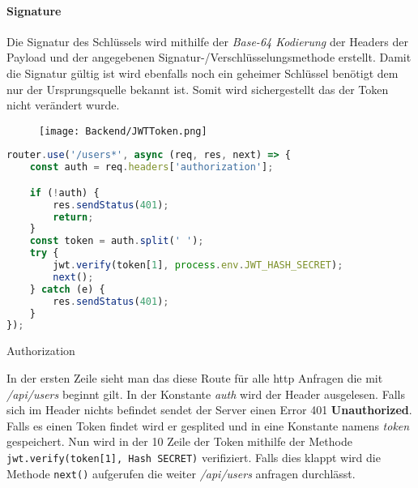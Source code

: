 \paragraph{Signature}
Die Signatur des Schlüssels wird mithilfe der \textit{Base-64 Kodierung} der Headers
der Payload und der angegebenen Signatur-/Verschlüsselungsmethode erstellt. Damit die Signatur
gültig ist wird ebenfalls noch ein geheimer Schlüssel benötigt dem nur der Ursprungsquelle bekannt
ist. Somit wird sichergestellt das der Token nicht verändert wurde.

\begin{figure}[H]
    \begin{center}
        \texttt{[image: Backend/JWTToken.png]}
    \end{center}
    \cite{PictureJWT}
\end{figure}

\pagebreak


\begin{code}[htp]
    \begin{lstlisting}[firstnumber=1,language=JavaScript, style=CMD]
    router.use('/users*', async (req, res, next) => {
    const auth = req.headers['authorization'];

    if (!auth) {
        res.sendStatus(401);
        return;
    }
    const token = auth.split(' ');
    try {
        jwt.verify(token[1], process.env.JWT_HASH_SECRET);
        next();
    } catch (e) {
        res.sendStatus(401);
    }
});
    \end{lstlisting}
    \caption{Authorization}
\end{code}

In der ersten Zeile sieht man das diese Route für alle http Anfragen
die mit \textit{/api/users} beginnt gilt. In der Konstante \textit{auth}
wird der Header ausgelesen. Falls sich im Header nichts befindet sendet der
Server einen Error 401 \textbf{Unauthorized}. Falls es einen Token findet
wird er gesplited und in eine Konstante namens \textit{token} gespeichert.
Nun wird in der 10 Zeile der Token mithilfe der Methode \texttt{jwt.verify(token[1], Hash SECRET)}
verifiziert. Falls dies klappt wird die Methode \texttt{next()} aufgerufen die
weiter \textit{/api/users} anfragen durchlässt.


\cite{JWT}


